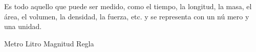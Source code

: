 
\question Es todo aquello que puede ser medido, como el tiempo, la longitud,
  la masa, el área, el volumen, la densidad, la fuerza, etc. y se representa
  con un nú mero y una unidad.

  \begin{oneparchoices}
    \choice Metro
    \choice Litro
    \CorrectChoice Magnitud
    \choice Regla
  \end{oneparchoices}
  \answerline[C]
